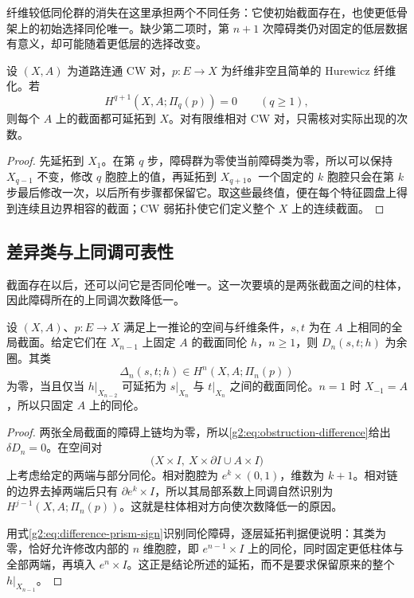 纤维较低同伦群的消失在这里承担两个不同任务：它使初始截面存在，也使更低骨架上的初始选择同伦唯一。缺少第二项时，第 \(n+1\) 次障碍类仍对固定的低层数据有意义，却可能随着更低层的选择改变。

\begin{corollary}\label{g2:cor:obstruction-groups-vanish}
	设 \((X,A)\) 为道路连通 CW 对，\(p:E\to X\) 为纤维非空且简单的 Hurewicz 纤维化。若
	\[
		H^{q+1}(X,A;\Pi_q(p))=0\qquad(q\ge1),
	\]
	则每个 \(A\) 上的截面都可延拓到 \(X\)。对有限维相对 CW 对，只需核对实际出现的次数。
\end{corollary}
\begin{proof}
	先延拓到 \(X_1\)。在第 \(q\) 步，障碍群为零使当前障碍类为零，所以可以保持 \(X_{q-1}\) 不变，修改 \(q\) 胞腔上的值，再延拓到 \(X_{q+1}\)。一个固定的 \(k\) 胞腔只会在第 \(k\) 步最后修改一次，以后所有步骤都保留它。取这些最终值，便在每个特征圆盘上得到连续且边界相容的截面；CW 弱拓扑使它们定义整个 \(X\) 上的连续截面。
\end{proof}

\subsection{差异类与上同调可表性}
\label{g2:subsec:1202:05}

截面存在以后，还可以问它是否同伦唯一。这一次要填的是两张截面之间的柱体，因此障碍所在的上同调次数降低一。

\begin{proposition}\label{g2:prop:section-difference-class}
	设 \((X,A)\)、\(p:E\to X\) 满足上一推论的空间与纤维条件，\(s,t\) 为在 \(A\) 上相同的全局截面。给定它们在 \(X_{n-1}\) 上固定 \(A\) 的截面同伦 \(h\)，\(n\ge1\)，则 \(D_n(s,t;h)\) 为余圈。其类
	\[
		\Delta_n(s,t;h)\in H^n(X,A;\Pi_n(p))
	\]
	为零，当且仅当 \(h|_{X_{n-2}}\) 可延拓为 \(s|_{X_n}\) 与 \(t|_{X_n}\) 之间的截面同伦。\(n=1\) 时 \(X_{-1}=A\)，所以只固定 \(A\) 上的同伦。
\end{proposition}
\begin{proof}
	两张全局截面的障碍上链均为零，所以\cref{g2:eq:obstruction-difference}给出 \(\delta D_n=0\)。在空间对
	\[
		\bigl(X\times I,\ X\times\partial I\cup A\times I\bigr)
	\]
	上考虑给定的两端与部分同伦。相对胞腔为 \(e^k\times(0,1)\)，维数为 \(k+1\)。相对链的边界去掉两端后只有 \(\partial e^k\times I\)，所以其局部系数上同调自然识别为 \(H^{j-1}(X,A;\Pi_n(p))\)。这就是柱体相对方向使次数降低一的原因。

	用式\eqref{g2:eq:difference-prism-sign}识别同伦障碍，逐层延拓判据便说明：其类为零，恰好允许修改内部的 \(n\) 维胞腔，即 \(e^{n-1}\times I\) 上的同伦，同时固定更低柱体与全部两端，再填入 \(e^n\times I\)。这正是结论所述的延拓，而不是要求保留原来的整个 \(h|_{X_{n-1}}\)。
\end{proof}

